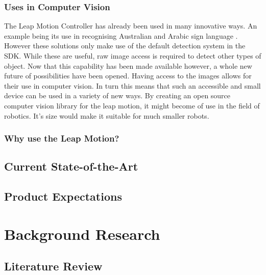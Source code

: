 \documentclass[11pt,oneside]{report}
\begin{document}
			\subsection{Uses in Computer Vision}
			The Leap Motion Controller has already been used in many innovative ways.
				An example being its use in recognising Australian and Arabic sign language \cite{journal:leapSignLanguage,journal:leapSignLanguage2}.
				However these solutions only make use of the default detection system in the SDK.
				While these are useful, raw image access is required to detect other types of object.
				Now that this capability has been made available however, a whole new future of possibilities have been opened.
				Having access to the images allows for their use in computer vision.
				In turn this means that such an accessible and small device can be used in a variety of new ways.
				By creating an open source computer vision library for the leap motion, it might become of use in the field of robotics.
				It's size would make it suitable for much smaller robots.
			\subsection{Why use the Leap Motion?}
			
		\section{Current State-of-the-Art}
		\section{Product Expectations}
		
	\chapter{Background Research}\label{chap:background}
		\section{Literature Review}
\end{document}
